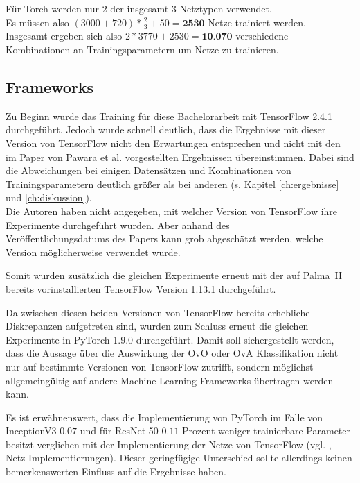 Für Torch \cite{pytorch} werden nur 2 der insgesamt 3 Netztypen verwendet.\\
Es müssen also $(3000 + 720) * \frac{2}{3} + 50 = \textbf{2530}$ Netze trainiert werden.\\

Insgesamt ergeben sich also $2 * 3770 + 2530 = \textbf{10.070}$ verschiedene Kombinationen an Trainingsparametern um Netze zu trainieren.

\subsection{Frameworks}
Zu Beginn wurde das Training für diese Bachelorarbeit mit TensorFlow 2.4.1 \cite{tensorflow} durchgeführt. Jedoch wurde schnell deutlich, dass die Ergebnisse mit dieser Version von TensorFlow \cite{tensorflow} nicht den Erwartungen entsprechen und nicht mit den im Paper von Pawara et al. \cite{pawaraPaper} vorgestellten Ergebnissen übereinstimmen. Dabei sind die Abweichungen bei einigen Datensätzen und Kombinationen von Trainingsparametern deutlich größer als bei anderen (s. Kapitel \ref{ch:ergebnisse} und \ref{ch:diskussion}). \\

Die Autoren haben nicht angegeben, mit welcher Version von TensorFlow \cite{tensorflow} ihre Experimente durchgeführt wurden. Aber anhand des\\ Veröffentlichungsdatums des Papers \cite{pawaraPaper} kann grob abgeschätzt werden, welche Version möglicherweise verwendet wurde.

Somit wurden zusätzlich die gleichen Experimente erneut mit der auf Palma~II \cite{palma2} bereits vorinstallierten TensorFlow Version 1.13.1 \cite{tensorflow} durchgeführt.

Da zwischen diesen beiden Versionen von TensorFlow \cite{tensorflow} bereits erhebliche Diskrepanzen aufgetreten sind, wurden zum Schluss erneut die gleichen Experimente in PyTorch 1.9.0 \cite{pytorch} durchgeführt.
Damit soll sichergestellt werden, dass die Aussage über die Auswirkung der OvO oder OvA Klassifikation nicht nur auf bestimmte Versionen von TensorFlow \cite{tensorflow} zutrifft, sondern möglichst allgemeingültig auf andere Machine-Learning Frameworks übertragen werden kann.

Es ist erwähnenswert, dass die Implementierung von PyTorch \cite{pytorch} im Falle von InceptionV3 $0.07$ und für ResNet-50 $0.11$ Prozent weniger trainierbare Parameter besitzt verglichen mit der Implementierung der Netze von TensorFlow \cite{tensorflow} (vgl. \cite{githubRepo}, Netz-Implementierungen). Dieser geringfügige Unterschied sollte allerdings keinen bemerkenswerten Einfluss auf die Ergebnisse haben.


